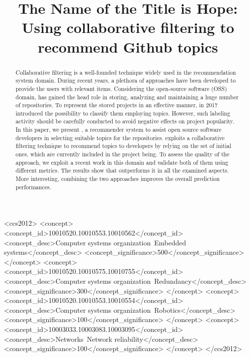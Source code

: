 \documentclass[sigconf]{acmart}
\begin{document}
\title{The Name of the Title is Hope}

\title{\CT: Using collaborative filtering to recommend Github topics}








\begin{abstract}
Collaborative filtering is a well-founded technique widely used in the recommendation system domain. During recent years, a plethora of approaches have been developed to provide the users with relevant items. Considering the open-source software (OSS) domain, \GH has gained the head role in storing, analyzing and maintaining a huge number of repositories. To represent the stored projects in an effective manner, in 2017 \GH introduced the possibility to classify them employing topics. However, such labeling activity should be carefully conducted to avoid negative effects on project popularity.
In this paper, we present \CT, a recommender system to assist open source software developers in selecting suitable topics for the repositories. \CT exploits a collaborative filtering technique to recommend topics to developers by relying on the set of initial ones, which are currently included in the project being. To assess the quality of the approach, we exploit a recent work in this domain and validate both of them using different metrics. The results show that \CT outperforms it in all the examined aspects. More interesting, combining the two approaches improves the overall prediction performances.
\end{abstract}

\begin{CCSXML}
<ccs2012>
 <concept>
  <concept_id>10010520.10010553.10010562</concept_id>
  <concept_desc>Computer systems organization~Embedded systems</concept_desc>
  <concept_significance>500</concept_significance>
 </concept>
 <concept>
  <concept_id>10010520.10010575.10010755</concept_id>
  <concept_desc>Computer systems organization~Redundancy</concept_desc>
  <concept_significance>300</concept_significance>
 </concept>
 <concept>
  <concept_id>10010520.10010553.10010554</concept_id>
  <concept_desc>Computer systems organization~Robotics</concept_desc>
  <concept_significance>100</concept_significance>
 </concept>
 <concept>
  <concept_id>10003033.10003083.10003095</concept_id>
  <concept_desc>Networks~Network reliability</concept_desc>
  <concept_significance>100</concept_significance>
 </concept>
</ccs2012>
\end{CCSXML}
\end{document}
